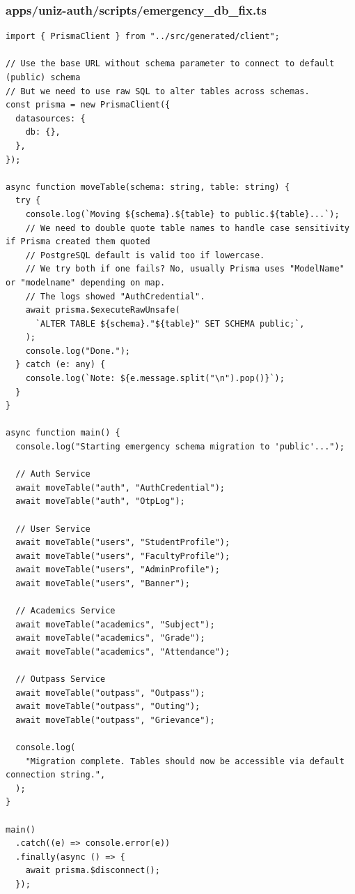 \documentclass[11pt,a4paper,oneside]{article}
\begin{document}
\subsubsection*{apps/uniz-auth/scripts/emergency\_db\_fix.ts}
\begin{lstlisting}
import { PrismaClient } from "../src/generated/client";

// Use the base URL without schema parameter to connect to default (public) schema
// But we need to use raw SQL to alter tables across schemas.
const prisma = new PrismaClient({
  datasources: {
    db: {},
  },
});

async function moveTable(schema: string, table: string) {
  try {
    console.log(`Moving ${schema}.${table} to public.${table}...`);
    // We need to double quote table names to handle case sensitivity if Prisma created them quoted
    // PostgreSQL default is valid too if lowercase.
    // We try both if one fails? No, usually Prisma uses "ModelName" or "modelname" depending on map.
    // The logs showed "AuthCredential".
    await prisma.$executeRawUnsafe(
      `ALTER TABLE ${schema}."${table}" SET SCHEMA public;`,
    );
    console.log("Done.");
  } catch (e: any) {
    console.log(`Note: ${e.message.split("\n").pop()}`);
  }
}

async function main() {
  console.log("Starting emergency schema migration to 'public'...");

  // Auth Service
  await moveTable("auth", "AuthCredential");
  await moveTable("auth", "OtpLog");

  // User Service
  await moveTable("users", "StudentProfile");
  await moveTable("users", "FacultyProfile");
  await moveTable("users", "AdminProfile");
  await moveTable("users", "Banner");

  // Academics Service
  await moveTable("academics", "Subject");
  await moveTable("academics", "Grade");
  await moveTable("academics", "Attendance");

  // Outpass Service
  await moveTable("outpass", "Outpass");
  await moveTable("outpass", "Outing");
  await moveTable("outpass", "Grievance");

  console.log(
    "Migration complete. Tables should now be accessible via default connection string.",
  );
}

main()
  .catch((e) => console.error(e))
  .finally(async () => {
    await prisma.$disconnect();
  });

\end{lstlisting}
\end{document}
